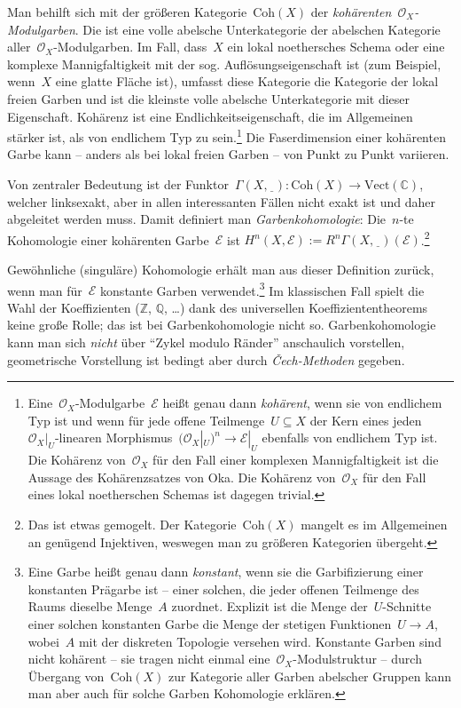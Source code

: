 \documentclass[a4paper,ngerman,12pt]{scrartcl}
\theoremstyle{definition}
\theoremstyle{plain}
\theoremstyle{remark}
\newcommand{\CC}{\mathbb{C}}
\newcommand{\ZZ}{\mathbb{Z}}
\newcommand{\QQ}{\mathbb{Q}}
\newcommand{\E}{\mathcal{E}}
\renewcommand{\O}{\mathcal{O}}
\newcommand{\Vect}{\mathrm{Vect}}
\newcommand{\Coh}{\mathrm{Coh}}
\newcommand{\placeholder}{\underline{\ \ }}
\begin{document}
Man behilft sich mit der größeren Kategorie~$\Coh(X)$ der
\emph{kohärenten~$\O_X$-Modulgarben}. Die ist eine volle abelsche Unterkategorie der
abelschen Kategorie aller~$\O_X$-Modulgarben. Im Fall, dass~$X$ ein
lokal noethersches Schema oder eine komplexe Mannigfaltigkeit mit der sog.
Auflösungseigenschaft ist (zum Beispiel, wenn~$X$ eine glatte Fläche ist), umfasst
diese Kategorie die Kategorie der lokal freien Garben und ist die kleinste
volle abelsche Unterkategorie mit dieser Eigenschaft. Kohärenz ist eine
Endlichkeitseigenschaft, die im Allgemeinen stärker ist, als von endlichem Typ
zu sein.\footnote{Eine~$\O_X$-Modulgarbe~$\E$ heißt genau dann \emph{kohärent},
wenn sie von endlichem Typ ist und wenn für jede offene Teilmenge~$U \subseteq
X$ der Kern eines jeden~$\O_X|_U$-linearen Morphismus~$(\O_X|_U)^n \to \E|_U$
ebenfalls von endlichem Typ ist. Die Kohärenz von~$\O_X$ für den Fall einer
komplexen Mannigfaltigkeit ist die Aussage des Kohärenzsatzes von Oka. Die
Kohärenz von~$\O_X$ für den Fall eines lokal noetherschen Schemas ist dagegen
trivial.} Die Faserdimension einer kohärenten Garbe kann -- anders als bei lokal freien
Garben -- von Punkt zu Punkt variieren.

Von zentraler Bedeutung ist der Funktor~$\Gamma(X,\placeholder) : \Coh(X) \to
\Vect(\CC)$, welcher linksexakt, aber in allen interessanten Fällen nicht
exakt ist und daher abgeleitet werden muss. Damit definiert man
\emph{Garbenkohomologie}: Die~$n$-te Kohomologie einer kohärenten Garbe~$\E$
ist $H^n(X, \E) := R^n \Gamma(X,\placeholder)(\E)$.\footnote{Das ist etwas
gemogelt. Der Kategorie~$\Coh(X)$ mangelt es im Allgemeinen an genügend
Injektiven, weswegen man zu größeren Kategorien übergeht.}

Gewöhnliche (singuläre) Kohomologie erhält man aus dieser Definition zurück,
wenn man für~$\E$ konstante Garben verwendet.\footnote{Eine Garbe heißt genau
dann \emph{konstant}, wenn sie die Garbifizierung einer konstanten Prägarbe ist
-- einer solchen, die jeder offenen Teilmenge des Raums dieselbe Menge~$A$
zuordnet. Explizit ist die Menge der~$U$-Schnitte einer solchen konstanten Garbe
die Menge der stetigen Funktionen~$U \to A$, wobei~$A$ mit der diskreten
Topologie versehen wird. Konstante Garben sind nicht kohärent -- sie tragen
nicht einmal eine~$\O_X$-Modulstruktur -- durch Übergang von~$\Coh(X)$ zur
Kategorie aller Garben abelscher Gruppen kann man aber auch für solche Garben
Kohomologie erklären.} Im klassischen Fall spielt die Wahl der Koeffizienten
($\ZZ$, $\QQ$, \ldots) dank des universellen Koeffiziententheorems keine große
Rolle; das ist bei Garbenkohomologie nicht so. Garbenkohomologie kann man sich
\emph{nicht} über "`Zykel modulo Ränder"' anschaulich vorstellen, geometrische
Vorstellung ist bedingt aber durch \emph{Čech-Methoden} gegeben.
\end{document}
